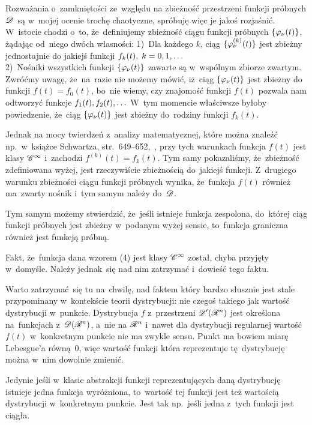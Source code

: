 \documentclass[a4paper,11pt]{article}
\begin{document}
\start {} Rozważania o~zamkniętości ze~względu na zbieżność
przestrzeni funkcji próbnych $\mathcal{D}$~są w~mojej ocenie trochę
chaotyczne, spróbuję więc je jakoś rozjaśnić. W~istocie chodzi o~to,
że~definiujemy zbieżność ciągu funkcji próbnych
$\{  \varphi_{ \nu }( t )  \}$, żądając od~niego dwóch własności: 1)~Dla
każdego $k$, ciąg $\{  \varphi_{ \nu }^{ ( k ) }( t )  \}$ jest zbieżny
jednostajnie do jakiejś funkcji
$f_{ k }( t ), \; k = 0, 1, \ldots$ \\
2)~Nośniki wszystkich funkcji $\{  \varphi_{ \nu }( t )  \}$ zawarte są
w~wspólnym zbiorze zwartym. \\
Zwróćmy uwagę, że~na~razie nie możemy mówić, iż~ciąg
$\{  \varphi_{ \nu }( t )  \}$ jest zbieżny do funkcji
$f( t ) = f_{ 0 }( t )$, bo~nie wiemy, czy znajomość funkcji $f( t )$
pozwala nam odtworzyć funkcje $f_{ 1 }( t ), f_{ 2 }( t ), \ldots$ W~tym
momencie właściwsze byłoby powiedzenie, że~ciąg
$\{  \varphi_{ \nu }( t )  \}$ jest zbieżny do~rodziny funkcji
$f_{ k }( t )$.

Jednak na mocy twierdzeń z~analizy matematycznej, które można znaleźć
np.~w~książce Schwartza, str.~649--652,~\cite{Sch79}, przy tych
warunkach funkcja $f( t )$ jest klasy $\mathcal{C}^{ \infty }$ i~zachodzi
$f^{ ( k ) }( t ) = f_{ k }( t )$. Tym samy pokazaliśmy, że~zbieżność
zdefiniowana wyżej, jest rzeczywiście zbieżnością do~jakiejś funkcji.
Z~drugiego warunku zbieżności ciągu funkcji próbnych wynika,
że~funkcja $f( t )$ również ma~zwarty nośnik i~tym samym należy
do~$\mathcal{D}$.

Tym samym możemy stwierdzić, że~jeśli istnieje funkcja zespolona,
do~której ciąg funkcji próbnych jest zbieżny w~podanym wyżej sensie,
to~funkcja graniczna również jest funkcją próbną.

\start {} Fakt, że~funkcja dana wzorem (4) jest klasy $\mathcal{C}^{ \infty }$
został, chyba przyjęty w~domyśle. Należy jednak~się nad nim zatrzymać
i~dowieść tego faktu. \Dok

\start {} Warto zatrzymać~się tu na~chwilę, nad faktem który
bardzo słusznie jest stale przypominany w~kontekście teorii
dystrybucji: nie czegoś takiego jak wartość dystrybucji w~punkcie.
Dystrybucja $f$ z~przestrzeni $\mathcal{D}'( \mathcal{R}^{ n } )$ jest określona
na~funkcjach z~$\mathcal{D}( \mathcal{R}^{ n } )$, a~nie na $\mathcal{R}^{ n }$ i~nawet dla dystrybucji
regularnej wartość $f( t )$ w~konkretnym punkcie nie ma zwykle sensu.
Punkt ma bowiem miarę Lebesgue'a równą~0, więc wartość funkcji która
reprezentuje tę~dystrybucję można w~nim dowolnie zmienić.

Jedynie jeśli w~klasie abstrakcji funkcji reprezentujących daną
dystrybucję istnieje jedna funkcja wyróżniona, to~wartość tej funkcji
jest też wartością dystrybucji w~konkretnym punkcie. Jest tak
np.~jeśli jedna z~tych funkcji jest ciągła.
\end{document}
